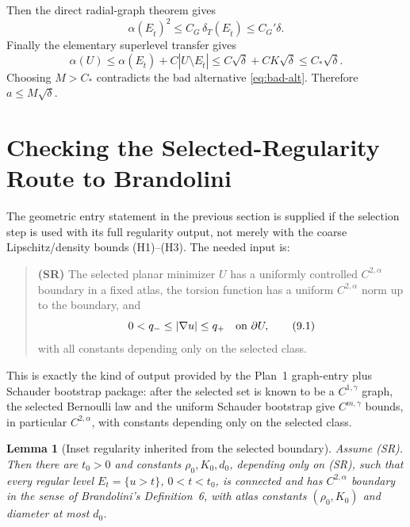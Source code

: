 \documentclass[11pt]{article}
\newtheorem{lemma}[theorem]{Lemma}
\newcommand{\dT}{\delta_T}
\begin{document}
Then the direct radial-graph theorem gives
\[
   \alpha(E_{\hat t})^2
      \le
   C_G\,\dT(E_{\hat t})
      \le
   C_G'\delta.
   \tag{8.6}\label{eq:graph-final}
\]
Finally the elementary superlevel transfer gives
\[
   \alpha(U)
      \le
   \alpha(E_{\hat t})+C|U\setminus E_{\hat t}|
      \le
   C\sqrt\delta + CK\sqrt\delta
      \le
   C_*\sqrt\delta.
   \tag{8.7}\label{eq:transfer-final}
\]
Choosing \(M>C_*\) contradicts the bad alternative
\eqref{eq:bad-alt}.  Therefore \(a\le M\sqrt\delta\).

\section{Checking the Selected-Regularity Route to Brandolini}

The geometric entry statement in the previous section is supplied if the
selection step is used with its full regularity output, not merely with the
coarse Lipschitz/density bounds (H1)--(H3).  The needed input is:

\begin{quote}
\textbf{(SR)} The selected planar minimizer \(U\) has a uniformly controlled
\(C^{2,\alpha}\) boundary in a fixed atlas, the torsion function has a
uniform \(C^{2,\alpha}\) norm up to the boundary, and
\[
   0<q_-\le |\nabla u|\le q_+
   \quad\hbox{on }\partial U,
   \tag{9.1}\label{eq:sr-hopf}
\]
with all constants depending only on the selected class.
\end{quote}

This is exactly the kind of output provided by the Plan~1 graph-entry plus
Schauder bootstrap package: after the selected set is known to be a
\(C^{1,\gamma}\) graph, the selected Bernoulli law and the uniform Schauder
bootstrap give \(C^{m,\gamma}\) bounds, in particular \(C^{2,\alpha}\), with
constants depending only on the selected class.

\begin{lemma}[Inset regularity inherited from the selected boundary]
\label{lem:inset-regularity}
Assume \emph{(SR)}.  Then there are \(t_0>0\) and constants
\(\rho_0,K_0,d_0\), depending only on \emph{(SR)}, such that every regular
level \(E_t=\{u>t\}\), \(0<t<t_0\), is connected and has \(C^{2,\alpha}\)
boundary in the sense of Brandolini's Definition~6, with atlas constants
\((\rho_0,K_0)\) and diameter at most \(d_0\).
\end{lemma}
\end{document}
